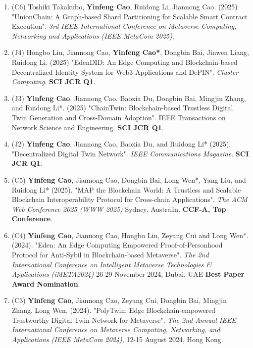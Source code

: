 \documentclass{resume}
\begin{document}
\begin{content}
\begin{enumerate}
        \item (C6) Toshiki Takakubo, \textbf{Yinfeng Cao}, Ruidong Li, Jiannong Cao. (2025) "UnionChain: A Graph-based Shard Partitioning for Scalable Smart Contract Execution". \textit{3rd IEEE International Conference on Metaverse Computing, Networking and Applications (IEEE MetaCom 2025)}.
        
        \item (J4) Hongbo Liu, Jiannong Cao, \textbf{Yinfeng Cao*}, Dongbin Bai, Jinwen Liang, Ruidong Li. (2025) "EdenDID: An Edge Computing and Blockchain-based Decentralized Identity System for Web3 Applications and DePIN". \textit{Cluster Computing}. \textbf{SCI JCR Q1}.
        
        \item (J3) \textbf{Yinfeng Cao}, Jiannong Cao, Baoxia Du, Dongbin Bai, Mingjin Zhang, and Ruidong Li*. (2025) "ChainTwin: Blockchain-based Trustless Digital Twin Generation and Cross-Domain Adoption". IEEE Transactions on Network Science and Engineering. \textbf{SCI JCR Q1}.
        
        \item (J2) \textbf{Yinfeng Cao}, Jiannong Cao, Baoxia Du, and Ruidong Li* (2025). "Decentralized Digital Twin Network". \textit{IEEE Communications Magazine}. \textbf{SCI JCR Q1}.
        
        \item (C5) \textbf{Yinfeng Cao}, Jiannong Cao, Dongbin Bai, Long Wen*, Yang Liu, and Ruidong Li* (2025). "MAP the Blockchain World: A Trustless and Scalable Blockchain Interoperability Protocol for Cross-chain Applications". \textit{The ACM Web Conference 2025 (WWW 2025)} Sydney, Australia. \textbf{CCF-A, Top Conference}.
        
        \item (C4) \textbf{Yinfeng Cao}, Jiannong Cao, Hongbo Liu, Zeyang Cui and Long Wen*. (2024). "Eden: An Edge Computing Empowered Proof-of-Personhood Protocol for Anti-Sybil in Blockchain-based Metaverse". \textit{The 2nd International Conference on Intelligent Metaverse Technologies \& Applications (iMETA2024)} 26-29 November 2024, Dubai, UAE \textbf{Best Paper Award Nomination}.
        
        \item (C3) \textbf{Yinfeng Cao}, Jiannong Cao, Zeyang Cui, Dongbin Bai, Mingjin Zhang, Long Wen. (2024). "PolyTwin: Edge Blockchain-empowered Trustworthy Digital Twin Network for Metaverse". \textit{The 2nd Annual IEEE International Conference on Metaverse Computing, Networking, and Applications (IEEE MetaCom 2024)}, 12-15 August 2024, Hong Kong.
        

\end{enumerate}
\end{content}
\end{document}
